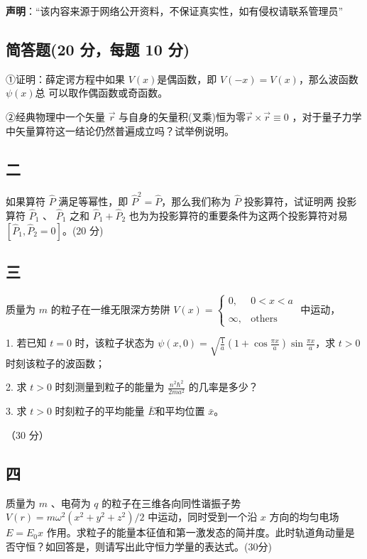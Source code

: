 
\textbf{声明}：“该内容来源于网络公开资料，不保证真实性，如有侵权请联系管理员”

\subsection{简答题(20 分，每题 10 分)}
①证明：薛定谔方程中如果 $V(x)$是偶函数，即 $V(-x)=V(x)$，那么波函数 $\psi(x)$总
可以取作偶函数或奇函数。

②经典物理中一个矢量 $\vec r$ 与自身的矢量积(叉乘)恒为零$\vec r \times \vec r\equiv
0$   ，对于量子力学
中矢量算符这一结论仍然普遍成立吗？试举例说明。

\subsection{二}
如果算符 $\hat{P}$ 满足等幂性，即 $\hat{P}^2 = \hat{P}$，那么我们称为 $\hat{P}$ 投影算符，试证明两
投影算符 $\hat{P}_1$ 、 $\hat{P}_1$ 之和 $\hat{P}_1+\hat{P}_2$ 也为为投影算符的重要条件为这两个投影算符对易$[\hat{P}_1,\hat{P}_2=0]$。(20 分)

\subsection{三}
质量为 $m$ 的粒子在一维无限深方势阱 $ V(x) = \begin{cases} 0, & 0 < x < a \\\\ \infty, & \text{others} \end{cases} $ 中运动，

1. 若已知 $ t = 0$ 时，该粒子状态为 $\psi(x,0) = \sqrt{\frac{1}{a}}(1 + \cos \frac{\pi x}{a})\sin \frac{\pi x}{a}$，求 $t > 0 $ 时刻该粒子的波函数；

2. 求 $ t > 0 $ 时刻测量到粒子的能量为 $\frac{n^2 \hbar^2}{2 m a^2}$ 的几率是多少？

3. 求 $t > 0 $ 时刻粒子的平均能量 $\bar{E}$和平均位置 $\bar{x}$。

（30 分）

\subsection{四}
质量为 $m$ 、电荷为 $q$ 的粒子在三维各向同性谐振子势 $V(r) = m\omega^2(x^2 + y^2 + z^2)/2$ 中运动，同时受到一个沿 $x$ 方向的均匀电场 $E = E_0 x$ 作用。求粒子的能量本征值和第一激发态的简并度。此时轨道角动量是否守恒？如回答是，则请写出此守恒力学量的表达式。(30分)
